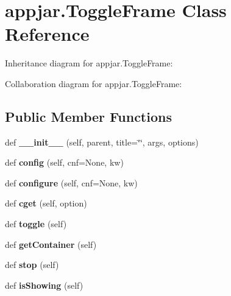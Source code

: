 \hypertarget{classappjar_1_1_toggle_frame}{}\section{appjar.\+Toggle\+Frame Class Reference}
\label{classappjar_1_1_toggle_frame}


Inheritance diagram for appjar.\+Toggle\+Frame\+:


Collaboration diagram for appjar.\+Toggle\+Frame\+:
\subsection*{Public Member Functions}
\begin{DoxyCompactItemize}
\item 
\mbox{\label{classappjar_1_1_toggle_frame_a4e7c7828ddb791747770ea8573fd62d8}} 
def {\bfseries \+\_\+\+\_\+init\+\_\+\+\_\+} (self, parent, title=\char`\"{}\char`\"{}, args, options)
\item 
\mbox{\label{classappjar_1_1_toggle_frame_ae3409ef251a67e0a9fbc35e9a409b091}} 
def {\bfseries config} (self, cnf=None, kw)
\item 
\mbox{\label{classappjar_1_1_toggle_frame_aec55d3d44e641c9394b01816c0627171}} 
def {\bfseries configure} (self, cnf=None, kw)
\item 
\mbox{\label{classappjar_1_1_toggle_frame_a2b868c8db447c06e92b798db2c278316}} 
def {\bfseries cget} (self, option)
\item 
\mbox{\label{classappjar_1_1_toggle_frame_adece0de9a2d00fb27d32aea57030a77d}} 
def {\bfseries toggle} (self)
\item 
\mbox{\label{classappjar_1_1_toggle_frame_ab47639221a5c1ce5f173e552d7060390}} 
def {\bfseries get\+Container} (self)
\item 
\mbox{\label{classappjar_1_1_toggle_frame_ad0c099d8a65021cc5f9976feb52ad430}} 
def {\bfseries stop} (self)
\item 
\mbox{\label{classappjar_1_1_toggle_frame_a9ec258ac86f090a3b1658419f5716906}} 
def {\bfseries is\+Showing} (self)
\end{DoxyCompactItemize}
